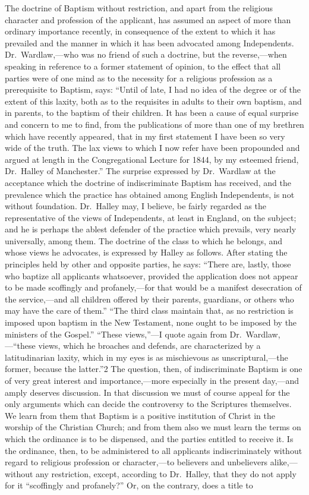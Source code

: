 \documentclass[]{book}
\begin{document}
The doctrine of Baptism without restriction, and apart from the religious character and profession of the applicant, has assumed an aspect of more than ordinary importance recently, in consequence of the extent to which it has prevailed and the manner in which it has been advocated among Independents. Dr.~Wardlaw,---who was no friend of such a doctrine, but the reverse,---when speaking in reference to a former statement of opinion, to the effect that all parties were of one mind as to the necessity for a religious profession as a prerequisite to Baptism, says: ``Until of late, I had no idea of the degree or of the extent of this laxity, both as to the requisites in adults to their own baptism, and in parents, to the baptism of their children. It has been a cause of equal surprise and concern to me to find, from the publications of more than one of my brethren which have recently appeared, that in my first statement I have been so very wide of the truth. The lax views to which I now refer have been propounded and argued at length in the Congregational Lecture for 1844, by my esteemed friend, Dr.~Halley of Manchester.'' The surprise expressed by Dr.~Wardlaw at the acceptance which the doctrine of indiscriminate Baptism has received, and the prevalence which the practice has obtained among English Independents, is not without foundation. Dr.~Halley may, I believe, be fairly regarded as the representative of the views of Independents, at least in England, on the subject; and he is perhaps the ablest defender of the practice which prevails, very nearly universally, among them. The doctrine of the class to which he belongs, and whose views he advocates, is expressed by Halley as follows. After stating the principles held by other and opposite parties, he says: ``There are, lastly, those who baptize all applicants whatsoever, provided the application does not appear to be made scoffingly and profanely,---for that would be a manifest desecration of the service,---and all children offered by their parents, guardians, or others who may have the care of them.'' ``The third class maintain that, as no restriction is imposed upon baptism in the New Testament, none ought to be imposed by the ministers of the Gospel.'' ``These views,''---I quote again from Dr.~Wardlaw,---``these views, which he broaches and defends, are characterized by a latitudinarian laxity, which in my eyes is as mischievous as unscriptural,---the former, because the latter.''2 The question, then, of indiscriminate Baptism is one of very great interest and importance,---more especially in the present day,---and amply deserves discussion. In that discussion we must of course appeal for the only arguments which can decide the controversy to the Scriptures themselves. We learn from them that Baptism is a positive institution of Christ in the worship of the Christian Church; and from them also we must learn the terms on which the ordinance is to be dispensed, and the parties entitled to receive it. Is the ordinance, then, to be administered to all applicants indiscriminately without regard to religious profession or character,---to believers and unbelievers alike,---without any restriction, except, according to Dr.~Halley, that they do not apply for it ``scoffingly and profanely?'' Or, on the contrary, does a title to 
\end{document}
